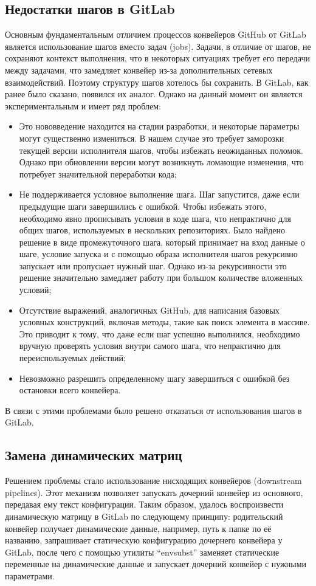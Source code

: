 \subsection{Недостатки шагов в GitLab}
Основным фундаментальным отличием процессов конвейеров GitHub от GitLab является использование шагов вместо задач (jobs).
Задачи, в отличие от шагов, не сохраняют контекст выполнения, что в некоторых ситуациях требует его передачи между задачами,
что замедляет конвейер из-за дополнительных сетевых взаимодействий.
Поэтому структуру шагов хотелось бы сохранить.
В GitLab, как ранее было сказано, появился их аналог.
Однако на данный момент он является экспериментальным и имеет ряд проблем:
\begin{itemize}
  \item Это нововведение находится на стадии разработки, и некоторые параметры могут существенно измениться. В нашем случае это требует заморозки текущей версии исполнителя шагов, чтобы избежать неожиданных поломок. Однако при обновлении версии могут возникнуть ломающие изменения, что потребует значительной переработки кода;
  \item Не поддерживается условное выполнение шага. Шаг запустится, даже если предыдущие шаги завершились с ошибкой. Чтобы избежать этого, необходимо явно прописывать условия в коде шага, что непрактично для общих шагов, используемых в нескольких репозиториях. Было найдено решение в виде промежуточного шага, который принимает на вход данные о шаге, условие запуска и с помощью образа исполнителя шагов рекурсивно запускает или пропускает нужный шаг. Однако из-за рекурсивности это решение значительно замедляет работу при большом количестве вложенных условий;
  \item Отсутствие выражений, аналогичных GitHub, для написания базовых условных конструкций, включая методы, такие как поиск элемента в массиве. Это приводит к тому, что даже если шаг успешно выполнился, необходимо вручную проверять условия внутри самого шага, что непрактично для переиспользуемых действий;
  \item Невозможно разрешить определенному шагу завершиться с ошибкой без остановки всего конвейера.
\end{itemize}

В связи с этими проблемами было решено отказаться от использования шагов в GitLab.

\subsection{Замена динамических матриц}
Решением проблемы стало использование нисходящих конвейеров (downstream pipelines). Этот механизм позволяет запускать дочерний конвейер из основного, передавая ему текст конфигурации. Таким образом, удалось воспроизвести динамическую матрицу в GitLab по следующему принципу: родительский конвейер получает динамические данные, например, путь к папке по её названию, запрашивает статическую конфигурацию дочернего конвейера у GitLab, после чего с помощью утилиты \enquote{envsubst} заменяет статические переменные на динамические данные и запускает дочерний конвейер с нужными параметрами.

